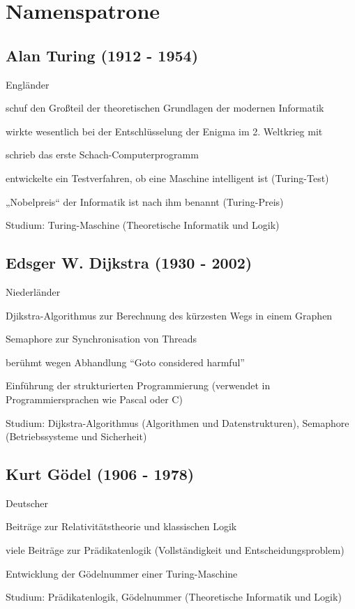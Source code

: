 \documentclass[a4paper,12pt]{scrreprt}
\begin{document}
\chapter{Namenspatrone}
\section*{Alan Turing (1912 - 1954)}
\begin{itemize*}
    \item Engländer
    \item schuf den Großteil der theoretischen Grundlagen der modernen Informatik
    \item wirkte wesentlich bei der Entschlüsselung der Enigma im 2. Weltkrieg mit
    \item schrieb das erste Schach-Computerprogramm
    \item entwickelte ein Testverfahren, ob eine Maschine intelligent ist (Turing-Test)
    \item „Nobelpreis“ der Informatik ist nach ihm benannt (Turing-Preis)
    \item Studium: Turing-Maschine (Theoretische Informatik und Logik)
\end{itemize*}

\section*{Edsger W. Dijkstra (1930 - 2002)}
\begin{itemize*}
    \item Niederländer
    \item Djikstra-Algorithmus zur Berechnung des kürzesten Wegs in einem Graphen
    \item Semaphore zur Synchronisation von Threads
    \item berühmt wegen Abhandlung ``Goto considered harmful''
    \item Einführung der strukturierten Programmierung (verwendet in Programmiersprachen wie
          Pascal oder C)
    \item Studium: Dijkstra-Algorithmus (Algorithmen und Datenstrukturen), Semaphore
          (Betriebssysteme und Sicherheit)
\end{itemize*}

\section*{Kurt Gödel (1906 - 1978)}
\begin{itemize*}
    \item Deutscher
    \item Beiträge zur Relativitätstheorie und klassischen Logik
    \item viele Beiträge zur Prädikatenlogik (Vollständigkeit und Entscheidungsproblem)
    \item Entwicklung der Gödelnummer einer Turing-Maschine
    \item Studium: Prädikatenlogik, Gödelnummer (Theoretische Informatik und Logik)
\end{itemize*}
\end{document}
